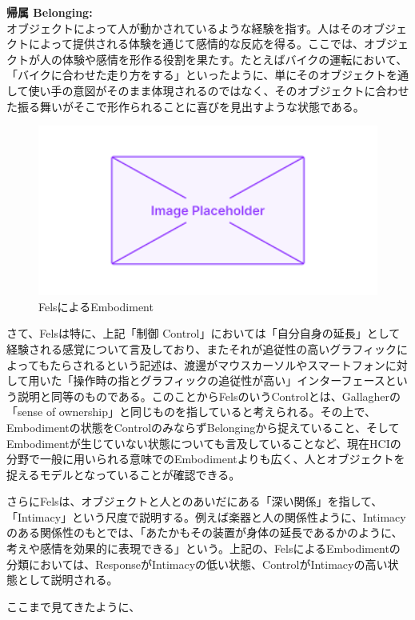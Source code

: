 \textbf{帰属 Belonging:}\\
オブジェクトによって人が動かされているような経験を指す。人はそのオブジェクトによって提供される体験を通じて感情的な反応を得る。ここでは、オブジェクトが人の体験や感情を形作る役割を果たす。たとえばバイクの運転において、「バイクに合わせた走り方をする」といったように、単にそのオブジェクトを通して使い手の意図がそのまま体現されるのではなく、そのオブジェクトに合わせた振る舞いがそこで形作られることに喜びを見出すような状態である。

\begin{figure}[H]
  \centering
  \includegraphics[width=15cm]{img/placeholder.png}
  \caption{FelsによるEmbodiment}
  \label{fig:fels_embodiment}
\end{figure}

さて、Felsは特に、上記「制御 Control」においては「自分自身の延長」として経験される感覚について言及しており、またそれが追従性の高いグラフィックによってもたらされるという記述は、渡邊がマウスカーソルやスマートフォンに対して用いた「操作時の指とグラフィックの追従性が高い」インターフェースという説明と同等のものである。このことからFelsのいうControlとは、Gallagherの「sense of ownership」と同じものを指していると考えられる。その上で、Embodimentの状態をControlのみならずBelongingから捉えていること、そしてEmbodimentが生じていない状態についても言及していることなど、現在HCIの分野で一般に用いられる意味でのEmbodimentよりも広く、人とオブジェクトを捉えるモデルとなっていることが確認できる。

さらにFelsは、オブジェクトと人とのあいだにある「深い関係」を指して、「Intimacy」という尺度で説明する。例えば楽器と人の関係性ように、Intimacyのある関係性のもとでは、「あたかもその装置が身体の延長であるかのように、考えや感情を効果的に表現できる」という。上記の、FelsによるEmbodimentの分類においては、ResponseがIntimacyの低い状態、ControlがIntimacyの高い状態として説明される。

ここまで見てきたように、

